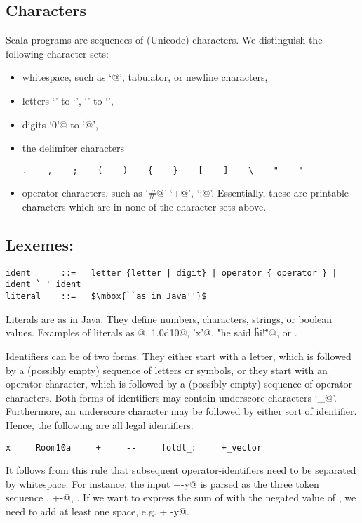 \documentclass[11pt]{book}
\begin{document}
\subsection*{Characters}

Scala programs are sequences of (Unicode) characters. We distinguish the
following character sets:
\begin{itemize}
\item
whitespace, such as `\verb@ @', tabulator, or newline characters,
\item
letters `\verb@a@' to `\verb@z@', `\verb@A@' to `\verb@Z@',
\item
digits \verb@`0'@ to `@',
\item
the delimiter characters
\begin{verbatim}
.    ,    ;    (    )    {    }    [    ]    \    "    '
\end{verbatim}
\item
operator characters, such as `\verb@#@' `\verb@+@',
`\verb@:@'. Essentially, these are printable characters which are
in none of the character sets above.
\end{itemize}

\subsection*{Lexemes:}

\begin{verbatim}
ident      ::=   letter {letter | digit} | operator { operator } | ident `_' ident
literal    ::=   $\mbox{``as in Java''}$
\end{verbatim}

Literals are as in Java. They define numbers, characters, strings, or
boolean values.  Examples of literals as @, \verb@1.0d10@, \verb@'x'@,
\verb@"he said \"hi!\""@, or \verb@true@.

Identifiers can be of two forms. They either start with a letter,
which is followed by a (possibly empty) sequence of letters or
symbols, or they start with an operator character, which is followed
by a (possibly empty) sequence of operator characters.  Both forms of
identifiers may contain underscore characters `\verb@_@'. Furthermore,
an underscore character may be followed by either sort of
identifier. Hence, the following are all legal identifiers:
\begin{verbatim}
x     Room10a     +     --     foldl_:     +_vector
\end{verbatim}
It follows from this rule that subsequent operator-identifiers need to
be separated by whitespace. For instance, the input
\verb@x+-y@ is parsed as the three token sequence \verb@x@, \verb@+-@,
\verb@y@. If we want to express the sum of \verb@x@ with the
negated value of \verb@y@, we need to add at least one space,
e.g. \verb@x+ -y@.
\end{document}
